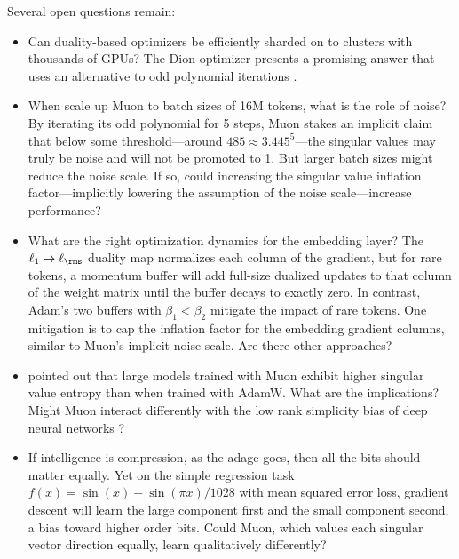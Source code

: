 Several open questions remain:
\begin{itemize}
    \item Can duality-based optimizers be efficiently sharded on to clusters with thousands of GPUs? The Dion optimizer presents a promising answer that uses an alternative to odd polynomial iterations \citep{ahn2025dioncommunicationefficientoptimizerlarge}.
    \item When \citet{shah2025muonpretraining} scale up Muon to batch sizes of 16M tokens, what is the role of noise? By iterating its odd polynomial for 5 steps, Muon stakes an implicit claim that below some threshold---around $485 \approx 3.445^5$---the singular values may truly be noise and will not be promoted to 1. But larger batch sizes might reduce the noise scale. If so, could increasing the singular value inflation factor---implicitly lowering the assumption of the noise scale---increase performance?
    \item What are the right optimization dynamics for the embedding layer? The $\ell_1 \to \ell_\rms$ duality map normalizes each column of the gradient, but for rare tokens, a momentum buffer will add full-size dualized updates to that column of the weight matrix until the buffer decays to exactly zero. In contrast, Adam's two buffers with $\beta_1 < \beta_2$ mitigate the impact of rare tokens. One mitigation is to cap the inflation factor for the embedding gradient columns, similar to Muon's implicit noise scale. Are there other approaches?
    \item \citet{liu2025muonscalablellmtraining} pointed out that large models trained with Muon exhibit higher singular value entropy than when trained with AdamW. What are the implications? Might Muon interact differently with 
    the low rank simplicity bias of deep neural networks \citep{huh2023lowranksimplicitybiasdeep}?
    \item If intelligence is compression, as the adage goes, then all the bits should matter equally. Yet on the simple regression task $f(x) = \sin(x) + \sin(\pi x)/1028$ with mean squared error loss, gradient descent will learn the large component first and the small component second, a bias toward higher order bits. Could Muon, which values each singular vector direction equally, learn qualitatively differently?
\end{itemize}

